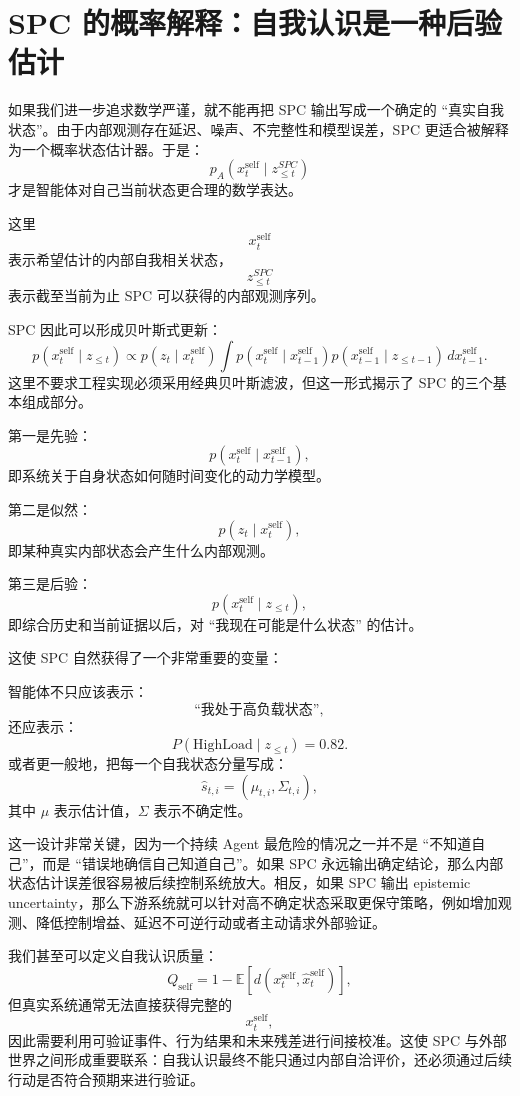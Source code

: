 \section{SPC 的概率解释：自我认识是一种后验估计}

如果我们进一步追求数学严谨，就不能再把 SPC 输出写成一个确定的 ``真实自我状态''。由于内部观测存在延迟、噪声、不完整性和模型误差，SPC 更适合被解释为一个概率状态估计器。于是：
\[
\boxed{
p_A
\left(
x_t^{\mathrm{self}}
\mid
z_{\le t}^{SPC}
\right)
}
\]
才是智能体对自己当前状态更合理的数学表达。

这里
\[
x_t^{\mathrm{self}}
\]
表示希望估计的内部自我相关状态，
\[
z_{\le t}^{SPC}
\]
表示截至当前为止 SPC 可以获得的内部观测序列。

SPC 因此可以形成贝叶斯式更新：
\[
p(x_t^{\mathrm{self}}\mid z_{\le t})
\propto
p(z_t\mid x_t^{\mathrm{self}})
\int
p(x_t^{\mathrm{self}}\mid x_{t-1}^{\mathrm{self}})
p(x_{t-1}^{\mathrm{self}}\mid z_{\le t-1})
\,dx_{t-1}^{\mathrm{self}}.
\]
这里不要求工程实现必须采用经典贝叶斯滤波，但这一形式揭示了 SPC 的三个基本组成部分。

第一是先验：
\[
p(x_t^{\mathrm{self}}\mid x_{t-1}^{\mathrm{self}}),
\]
即系统关于自身状态如何随时间变化的动力学模型。

第二是似然：
\[
p(z_t\mid x_t^{\mathrm{self}}),
\]
即某种真实内部状态会产生什么内部观测。

第三是后验：
\[
p(x_t^{\mathrm{self}}\mid z_{\le t}),
\]
即综合历史和当前证据以后，对 ``我现在可能是什么状态'' 的估计。

这使 SPC 自然获得了一个非常重要的变量：
\begin{statementbox}
\centering
{}
\end{statementbox}
智能体不只应该表示：
\[
\text{``我处于高负载状态''},
\]
还应表示：
\[
P(\text{HighLoad}\mid z_{\le t})=0.82.
\]
或者更一般地，把每一个自我状态分量写成：
\[
\hat{s}_{t,i}
=
(\mu_{t,i},\Sigma_{t,i}),
\]
其中 $\mu$ 表示估计值，$\Sigma$ 表示不确定性。

这一设计非常关键，因为一个持续 Agent 最危险的情况之一并不是 ``不知道自己''，而是 ``错误地确信自己知道自己''。如果 SPC 永远输出确定结论，那么内部状态估计误差很容易被后续控制系统放大。相反，如果 SPC 输出 epistemic uncertainty，那么下游系统就可以针对高不确定状态采取更保守策略，例如增加观测、降低控制增益、延迟不可逆行动或者主动请求外部验证。

我们甚至可以定义自我认识质量：
\[
Q_{\mathrm{self}}
=
1-
\mathbb E
\left[
d(
x_t^{\mathrm{self}},
\hat{x}_t^{\mathrm{self}}
)
\right],
\]
但真实系统通常无法直接获得完整的
\[
x_t^{\mathrm{self}},
\]
因此需要利用可验证事件、行为结果和未来残差进行间接校准。这使 SPC 与外部世界之间形成重要联系：自我认识最终不能只通过内部自洽评价，还必须通过后续行动是否符合预期来进行验证。

